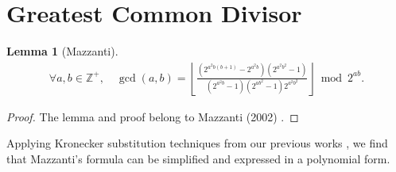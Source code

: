 \documentclass[11pt,reqno]{article}
\theoremstyle{plain}
\newtheorem{lemma}[theorem]{Lemma}
\theoremstyle{definition}
\newcommand{\floor}[1]{\left\lfloor #1 \right\rfloor}
\newcommand{\Z}{\mathbb{Z}}
\begin{document}
\section{Greatest Common Divisor} \label{section:gcd}

\begin{lemma}[Mazzanti] \label{proof:mazzantigcd}
\begin{align*}
\forall a,b \in \Z^+, \quad
\gcd(a,b) = \floor{\frac{(2^{a^2 b(b+1)} - 2^{a^2 b}) (2^{a^2 b^2} - 1)}
         {(2^{a^2 b} - 1)(2^{ab^2}-1)2^{a^2 b^2}}} \bmod 2^{ab}.
\end{align*}
\end{lemma}
\begin{proof}
The lemma and proof belong to Mazzanti (2002) \cite{mazzanti2002plainbases}.
\end{proof}

Applying Kronecker substitution techniques from our previous works \cite{shunia2023simple, shunia2024polynomial}, we find that Mazzanti's formula can be simplified and expressed in a polynomial form.
\end{document}
